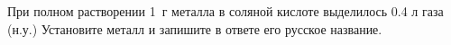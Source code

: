 
При полном растворении 1~г металла в соляной кислоте выделилось 0.4 л газа (н.у.)
Установите металл и запишите в ответе его русское название.

